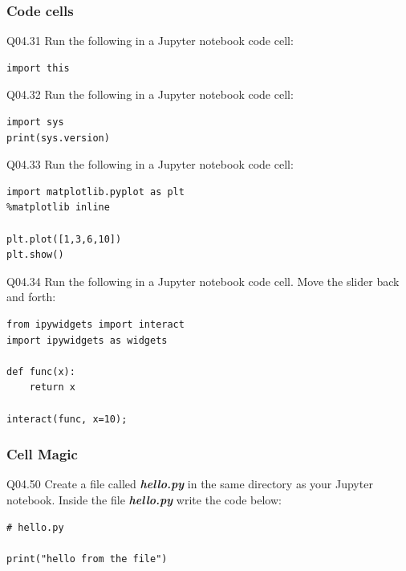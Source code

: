 \documentclass{book}
\newenvironment{problems}{}{}  %
\begin{document}
    
        \begin{problems}
        \subsubsection{Code cells}\label{code-cells}

Q04.31 Run the following in a Jupyter notebook code cell:

\begin{lstlisting}
import this
\end{lstlisting}

Q04.32 Run the following in a Jupyter notebook code cell:

\begin{lstlisting}
import sys
print(sys.version)
\end{lstlisting}

Q04.33 Run the following in a Jupyter notebook code cell:

\begin{lstlisting}
import matplotlib.pyplot as plt
%matplotlib inline

plt.plot([1,3,6,10])
plt.show()
\end{lstlisting}

Q04.34 Run the following in a Jupyter notebook code cell. Move the
slider back and forth:

\begin{lstlisting}
from ipywidgets import interact
import ipywidgets as widgets

def func(x):
    return x
    
interact(func, x=10);
\end{lstlisting}
        \end{problems}

    




    
        \subsubsection{Cell Magic}\label{cell-magic}

Q04.50 Create a file called \textbf{\emph{hello.py}} in the same
directory as your Jupyter notebook. Inside the file
\textbf{\emph{hello.py}} write the code below:

\begin{lstlisting}
# hello.py

print("hello from the file")
\end{lstlisting}
\end{document}
